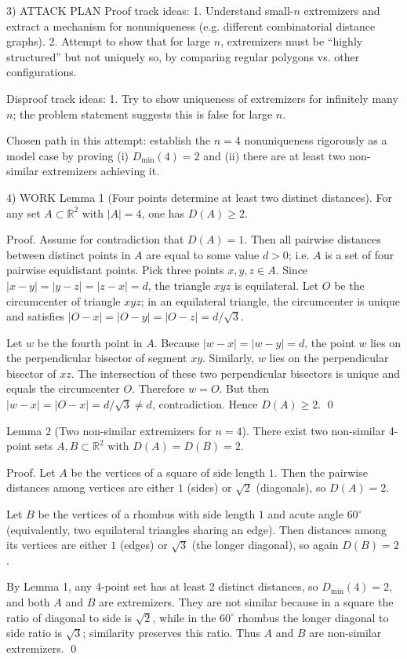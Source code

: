 3) ATTACK PLAN
Proof track ideas:
1. Understand small-$n$ extremizers and extract a mechanism for nonuniqueness (e.g. different combinatorial distance graphs).
2. Attempt to show that for large $n$, extremizers must be ``highly structured'' but not uniquely so, by comparing regular polygons vs. other configurations.

Disproof track ideas:
1. Try to show uniqueness of extremizers for infinitely many $n$; the problem statement suggests this is false for large $n$.

Chosen path in this attempt: establish the $n=4$ nonuniqueness rigorously as a model case by proving (i) $D_{\min}(4)=2$ and (ii) there are at least two non-similar extremizers achieving it.

4) WORK
Lemma 1 (Four points determine at least two distinct distances).
For any set $A\subset\mathbb R^2$ with $|A|=4$, one has $D(A)\ge 2$.

Proof.
Assume for contradiction that $D(A)=1$.
Then all pairwise distances between distinct points in $A$ are equal to some value $d>0$; i.e. $A$ is a set of four pairwise equidistant points.
Pick three points $x,y,z\in A$.
Since $|x-y|=|y-z|=|z-x|=d$, the triangle $xyz$ is equilateral.
Let $O$ be the circumcenter of triangle $xyz$; in an equilateral triangle, the circumcenter is unique and satisfies $|O-x|=|O-y|=|O-z|=d/\sqrt3$.

Let $w$ be the fourth point in $A$.
Because $|w-x|=|w-y|=d$, the point $w$ lies on the perpendicular bisector of segment $xy$.
Similarly, $w$ lies on the perpendicular bisector of $xz$.
The intersection of these two perpendicular bisectors is unique and equals the circumcenter $O$.
Therefore $w=O$.
But then $|w-x|=|O-x|=d/\sqrt3\ne d$, contradiction.
Hence $D(A)\ge 2$. \qed

Lemma 2 (Two non-similar extremizers for $n=4$).
There exist two non-similar 4-point sets $A,B\subset\mathbb R^2$ with $D(A)=D(B)=2$.

Proof.
Let $A$ be the vertices of a square of side length $1$. Then the pairwise distances among vertices are either $1$ (sides) or $\sqrt2$ (diagonals), so $D(A)=2$.

Let $B$ be the vertices of a rhombus with side length $1$ and acute angle $60^\circ$ (equivalently, two equilateral triangles sharing an edge).
Then distances among its vertices are either $1$ (edges) or $\sqrt3$ (the longer diagonal), so again $D(B)=2$.

By Lemma 1, any 4-point set has at least 2 distinct distances, so $D_{\min}(4)=2$, and both $A$ and $B$ are extremizers.
They are not similar because in a square the ratio of diagonal to side is $\sqrt2$, while in the $60^\circ$ rhombus the longer diagonal to side ratio is $\sqrt3$; similarity preserves this ratio.
Thus $A$ and $B$ are non-similar extremizers. \qed

